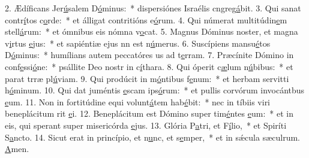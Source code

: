 2. Ædíficans Jer\uline{ú}salem D\uline{ó}minus:~* dispersiónes Israélis cngreg\uline{á}bit.
3. Qui sanat contr\uline{í}tos c\uline{o}rde:~* et álligat contritións e\uline{ó}rum.
4. Qui númerat multitúdin\uline{e}m stell\uline{á}rum:~* et ómnibus eis nómna v\uline{o}cat.
5. Magnus Dóminus noster, et magna v\uline{i}rtus \uline{e}jus:~* et sapiéntiæ ejus nn est n\uline{ú}merus.
6. Suscípiens mansu\uline{é}tos D\uline{ó}minus:~* humílians autem peccatóres us ad t\uline{e}rram.
7. Præcínite Dómino in conf\uline{e}ssi\uline{ó}ne:~* psállite Deo nostr in c\uline{í}thara.
8. Qui óperit c\uline{æ}lum n\uline{ú}bibus:~* et parat trræ pl\uline{ú}viam.
9. Qui prodúcit in m\uline{ó}ntibus f\uline{e}num:~* et herbam servitti h\uline{ó}minum.
10. Qui dat juméntis \uline{e}scam ips\uline{ó}rum:~* et pullis corvórum invocántbus \uline{e}um.
11. Non in fortitúdine equi volunt\uline{á}tem hab\uline{é}bit:~* nec in tíbiis viri beneplácitum rit \uline{e}i.
12. Beneplácitum est Dómino super tim\uline{é}ntes \uline{e}um:~* et in eis, qui sperant super misericórda \uline{e}jus.
13. Glória P\uline{a}tri, et F\uline{í}lio,~* et Spiríti S\uline{a}ncto.
14. Sicut erat in princípio, et n\uline{u}nc, et s\uline{e}mper,~* et in sǽcula sæculrum. \uline{A}men.
